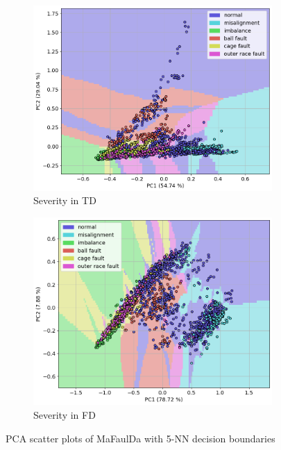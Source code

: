 \documentclass{llncs}
\begin{document}
\begin{figure}
\begin{subfigure}[b]{0.24\textwidth}
         \centering
         \includegraphics[width=\textwidth]{fig/scatter-mafaulda/td-severity.png}
         \caption{Severity in TD}
     \end{subfigure}
     \hfill
     \begin{subfigure}[b]{0.24\textwidth}
         \centering
         \includegraphics[width=\textwidth]{fig/scatter-mafaulda/fd-severity.png}
         \caption{Severity in FD}
     \end{subfigure}
     \caption{PCA scatter plots of MaFaulDa with 5-NN decision boundaries}
     \label{fig:mafaulda-scatter}
\end{figure}
\end{document}
